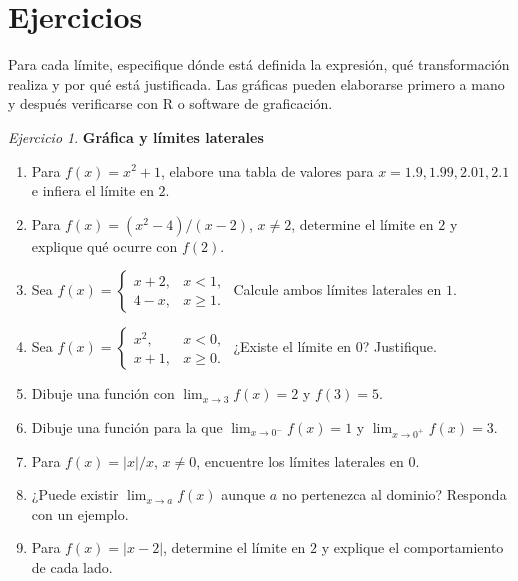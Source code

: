 \documentclass[12pt]{article}
\theoremstyle{remark}
\newtheorem{Ejer}{Ejercicio}
\begin{document}
\section{Ejercicios}
Para cada límite, especifique dónde está definida la expresión, qué transformación realiza y por qué está justificada. Las gráficas pueden elaborarse primero a mano y después verificarse con R o software de graficación. 

\begin{Ejer}\textbf{Gráfica y límites laterales}
\begin{enumerate}[series=banco]
\item Para $f(x)=x^2+1$, elabore una tabla de valores para $x=1.9,1.99,2.01,2.1$ e infiera el límite en $2$.
\item Para $f(x)=(x^2-4)/(x-2)$, $x\ne2$, determine el límite en $2$ y explique qué ocurre con $f(2)$.
\item Sea $f(x)=\begin{cases}x+2,&x<1,\\4-x,&x\ge1.\end{cases}$ Calcule ambos límites laterales en $1$.
\item Sea $f(x)=\begin{cases}x^2,&x<0,\\x+1,&x\ge0.\end{cases}$ ¿Existe el límite en $0$? Justifique.
\item Dibuje una función con $\lim_{x\to3}f(x)=2$ y $f(3)=5$.
\item Dibuje una función para la que $\lim_{x\to0^-}f(x)=1$ y $\lim_{x\to0^+}f(x)=3$.
\item Para $f(x)=|x|/x$, $x\ne0$, encuentre los límites laterales en $0$.
\item ¿Puede existir $\lim_{x\to a}f(x)$ aunque $a$ no pertenezca al dominio? Responda con un ejemplo.
\item Para $f(x)=|x-2|$, determine el límite en $2$ y explique el comportamiento de cada lado.
\end{enumerate}
\end{Ejer}
\end{document}
